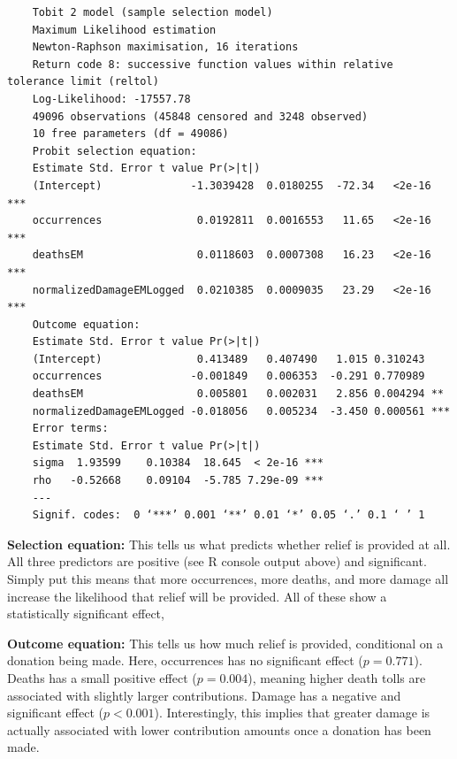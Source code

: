 \documentclass[12pt,letterpaper]{article}
\begin{document}
\begin{BVerbatim}
	Tobit 2 model (sample selection model)
	Maximum Likelihood estimation
	Newton-Raphson maximisation, 16 iterations
	Return code 8: successive function values within relative tolerance limit (reltol)
	Log-Likelihood: -17557.78 
	49096 observations (45848 censored and 3248 observed)
	10 free parameters (df = 49086)
	Probit selection equation:
	Estimate Std. Error t value Pr(>|t|)    
	(Intercept)              -1.3039428  0.0180255  -72.34   <2e-16 ***
	occurrences               0.0192811  0.0016553   11.65   <2e-16 ***
	deathsEM                  0.0118603  0.0007308   16.23   <2e-16 ***
	normalizedDamageEMLogged  0.0210385  0.0009035   23.29   <2e-16 ***
	Outcome equation:
	Estimate Std. Error t value Pr(>|t|)    
	(Intercept)               0.413489   0.407490   1.015 0.310243    
	occurrences              -0.001849   0.006353  -0.291 0.770989    
	deathsEM                  0.005801   0.002031   2.856 0.004294 ** 
	normalizedDamageEMLogged -0.018056   0.005234  -3.450 0.000561 ***
	Error terms:
	Estimate Std. Error t value Pr(>|t|)    
	sigma  1.93599    0.10384  18.645  < 2e-16 ***
	rho   -0.52668    0.09104  -5.785 7.29e-09 ***
	---
	Signif. codes:  0 ‘***’ 0.001 ‘**’ 0.01 ‘*’ 0.05 ‘.’ 0.1 ‘ ’ 1
\end{BVerbatim}
\normalsize \newline

\noindent \textbf{Selection equation:} This tells us what predicts whether relief is provided at all. All three predictors are positive (see R console output above) and significant. Simply put this means that more occurrences, more deaths, and more damage all increase the likelihood that relief will be provided. All of these show a statistically significant effect,\newline

\noindent \textbf{Outcome equation:} This tells us how much relief is provided, conditional on a donation being made. Here, occurrences has no significant effect ($p = 0.771$). Deaths has a small positive effect ($p = 0.004$), meaning higher death tolls are associated with slightly larger contributions. Damage has a negative and significant effect ($p < 0.001$). Interestingly, this implies that greater damage is actually associated with lower contribution amounts once a donation has been made.\newline


\newpage
\end{document}

